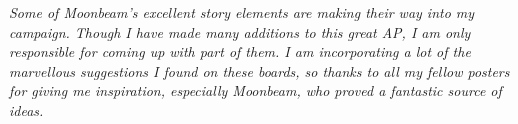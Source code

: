  {\itshape Some of Moonbeam's excellent story elements are making their way into my campaign. Though I have made many additions to this great AP, I am only responsible for coming up with part of them. I am incorporating a lot of the marvellous suggestions I found on these boards, so thanks to all my fellow posters for giving me inspiration, especially Moonbeam, who proved a fantastic source of ideas.}  